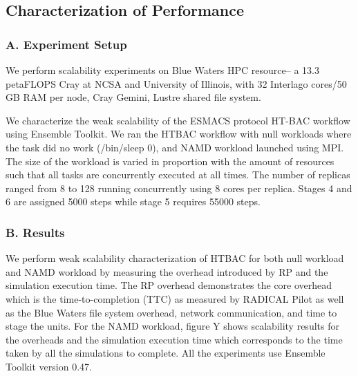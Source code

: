 \subsection{Characterization of Performance}

\subsubsection{A. Experiment Setup}

We perform scalability experiments on Blue Waters HPC resource-- a 13.3 petaFLOPS Cray at NCSA and University of Illinois, with 32 Interlago cores/50 GB RAM per node, Cray Gemini, Lustre shared file system. 

We characterize the weak scalability of the ESMACS protocol HT-BAC workflow using Ensemble Toolkit. We ran the HTBAC workflow with null workloads where the task did no work (/bin/sleep 0), and NAMD workload launched using MPI. The size of the workload is varied in proportion with the amount of resources such that all tasks are concurrently executed at all times. The number of replicas ranged from 8 to 128 running concurrently using 8 cores per replica. Stages 4 and 6 are assigned 5000 steps while stage 5 requires 55000 steps. 

\subsubsection{B. Results}

We perform weak scalability characterization of HTBAC for both null workload and NAMD workload by measuring the overhead introduced by RP and the simulation execution time. The RP overhead demonstrates the core overhead which is the time-to-completion (TTC) as measured by RADICAL Pilot as well as the Blue Waters file system overhead, network communication, and time to stage the units. For the NAMD workload, figure Y shows scalability results for the overheads and the simulation execution time which corresponds to the time taken by all the simulations to complete. All the experiments use Ensemble Toolkit version 0.47. 

